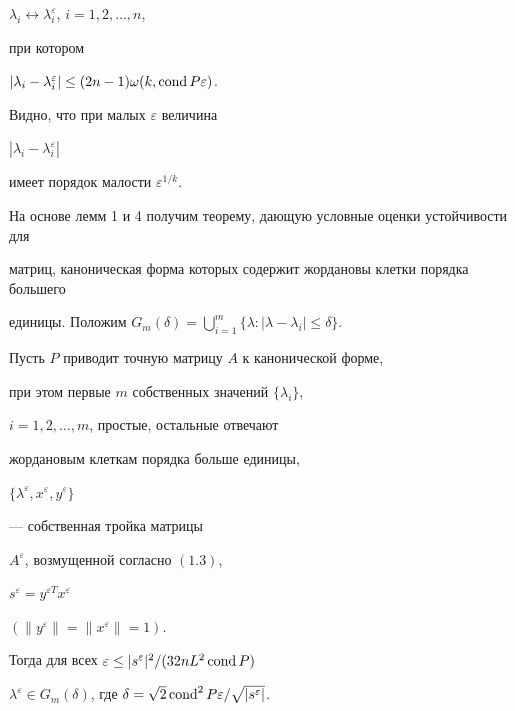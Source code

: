 $\lambda_i \longleftrightarrow\lambda^{\varepsilon}_i$, $i=1,2,\dotsc,n$,


при котором


$|\lambda_i-\lambda_i^{\varepsilon}|\le (2n-1)\omega(k,\operatorname{cond} P \varepsilon)$.





Видно, что при малых $\varepsilon$ величина


$|\lambda_i-\lambda_i^{\varepsilon}|$


имеет порядок малости $\varepsilon^{1/k}$.


На основе лемм 1 и 4 получим теорему, дающую условные оценки устойчивости для


матриц, каноническая форма которых содержит жордановы клетки порядка большего


единицы. Положим $G_m(\delta)=\bigcup\limits_{i=1}^m


\{\lambda : |\lambda-\lambda_i| \le \delta \}$.





\begin{thm}


Пусть $P$ приводит точную матрицу $A$ к канонической форме,


при этом первые $m$ собственных значений $\{\lambda_i\}$,


$i=1,2,\dotsc,m$, простые, остальные отвечают 


жордановым клеткам порядка больше единицы,


$\{\lambda^{\varepsilon},x^{\varepsilon},y^{\varepsilon}\}$


--- собственная тройка матрицы


$A^{\varepsilon}$, возмущенной согласно $(1.3)$,


$s^{\varepsilon}=y^{\varepsilon T}x^{\varepsilon}$


$(\|y^{\varepsilon}\|=\|x^{\varepsilon}\|=1)$.


Тогда для всех $\varepsilon\le |s^{\varepsilon}|^2/(32 n L^2 \operatorname{cond} P)$


$\lambda^{\varepsilon}\in G_m(\delta)$, где $\delta=


\sqrt{2} \cond^2 P \varepsilon /\sqrt{|s^{\varepsilon}|}$.


\end{thm}






